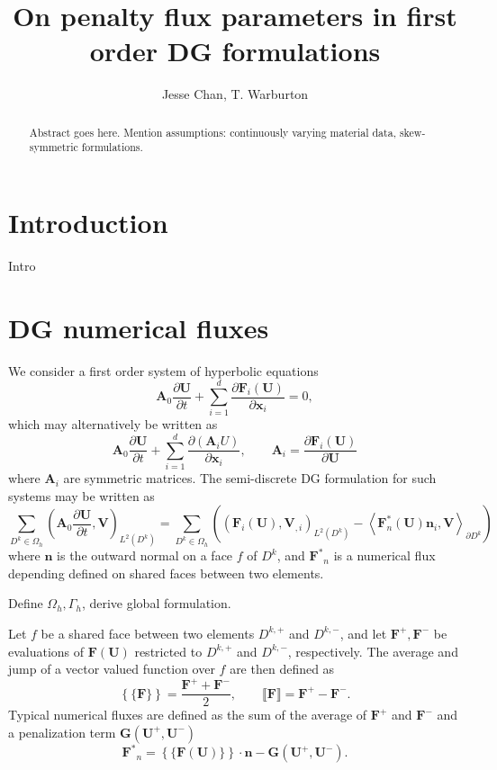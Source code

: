 \documentclass[10pt]{article}
\date{}
\author{Jesse Chan, T. Warburton}
\title{On penalty flux parameters in first order DG formulations}
\newcommand{\pd}[2]{\frac{\partial#1}{\partial#2}}
\newcommand{\LRp}[1]{\left( #1 \right)}
\newcommand{\LRa}[1]{\left\langle #1 \right\rangle}
\newcommand{\LRc}[1]{\left\{ #1 \right\}}
\newcommand{\jump}[1] {\ensuremath{\llbracket#1\rrbracket}}
\newcommand{\avg}[1] {\ensuremath{\LRc{\!\{#1\}\!}}}
\newcommand{\Lk}{L^2\LRp{D^k}}
\newcommand{\Gh}{\Gamma_h}
\newcommand{\Oh}{\Omega_h}
\newcommand{\note}[1]{{\color{blue}#1}}
\begin{document}
\maketitle

\begin{abstract}
Abstract goes here.  Mention assumptions: continuously varying material data, skew-symmetric formulations.  
\end{abstract}

\section{Introduction}

\note{Intro}

\section{DG numerical  fluxes}

We consider a first order system of hyperbolic equations
\[
\bm{A}_0\pd{\bm{U}}{t} + \sum_{i=1}^d \pd{\bm{F}_i(\bm{U})}{\bm{x}_i} = 0,
\]
which may alternatively be written as
\[
\bm{A}_0\pd{\bm{U}}{t} + \sum_{i=1}^d \pd{\LRp{\bm{A}_{i}U}}{\bm{x}_i}, \qquad \bm{A}_{i} = \pd{\bm{F}_i(\bm{U})}{\bm{U}}
\]
where $\bm{A}_{i}$ are symmetric matrices.  The semi-discrete DG formulation for such systems may be written as 
\[
\sum_{D^k \in \Oh} \LRp{\bm{A}_0\pd{\bm{U}}{t},\bm{V} }_{\Lk} = \sum_{D^k \in \Oh}\LRp{ \LRp{\bm{F}_i(\bm{U}), \bm{V}_{,i}}_{\Lk} - \LRa{\bm{F}_n^*(\bm{U})\bm{n}_i,\bm{V}}_{\partial D^k}}
\]
where $\bm{n}$ is the outward normal on a face $f$ of $D^k$, and $\bm{F^*}_n$ is a numerical flux depending defined on shared faces between two elements.  

\note{Define $\Oh, \Gh$, derive global formulation.}  


Let $f$ be a shared face between two elements $D^{k,+}$ and $D^{k,-}$, and let $\bm{F}^+, \bm{F}^-$ be evaluations of $\bm{F}(\bm{U})$ restricted to $D^{k,+}$ and $D^{k,-}$, respectively.  The average and jump of a vector valued function over $f$ are then defined as
\[
\avg{\bm{F}} = \frac{\bm{F}^+ + \bm{F}^-}{2}, \qquad \jump{\bm{F}} = \bm{F}^+ - \bm{F}^-.
\]
Typical numerical fluxes are defined as the sum of the average of $\bm{F}^+$ and $\bm{F}^-$ and a penalization term $\bm{G(\bm{U}^+,\bm{U}^-)}$
\begin{equation}
\bm{F^*}_n = \avg{\bm{F}(\bm{U})}\cdot \bm{n} - \bm{G(\bm{U}^+,\bm{U}^-)}.
\label{eq:flux}
\end{equation}
\end{document}
